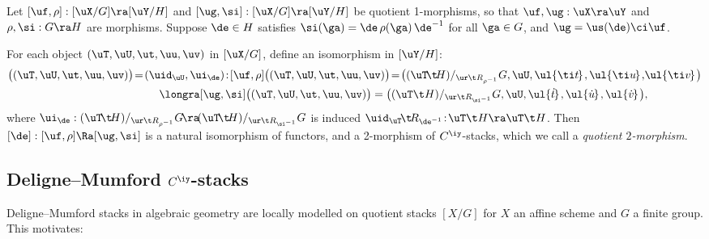 \documentclass{article}
\begin{document}
\begin{ex} Let $[\uf,\rho]:[\uX/G]\ra[\uY/H]$ and
$[\ug,\si]:[\uX/G]\ra[\uY/H]$ be quotient 1-morphisms, so that
$\uf,\ug:\uX\ra\uY$ and $\rho,\si:G\ra H$ are morphisms. Suppose
$\de\in H$ satisfies $\si(\ga)=\de\,\rho(\ga)\,\de^{-1}$ for all
$\ga\in G$, and $\ug=\us(\de)\ci\uf$.

For each object $(\uT,\uU,\ut,\uu,\uv)$ in $[\uX/G]$, define an
isomorphism in $[\uY/H]$:
\begin{align*}
[\de]\bigl((\uT,\uU,\ut,\uu,\uv)\bigr)\!=\!(\uid_\uU,\ui_\de)\!:\!
[\uf,\rho]\bigl((\uT,\uU,\ut,\uu,\uv)\bigr)\!=\!
\bigl((\uT\!\t\! H)/_{\ur\t R_{\rho^{-1}}} G,\uU,
\ul{\ti t\kern -0.1em}\kern 0.1em,
\ul{\ti u\kern -0.1em}\kern 0.1em,&
\ul{\ti v\kern -0.1em}\kern 0.1em\bigr)\\
\longra [\ug,\si]\bigl((\uT,\uU,\ut,\uu,\uv)\bigr)= \bigl((\uT\t
H)/_{\ur\t R_{\si^{-1}}} G,\uU, \ul{\dot t\kern -0.1em}\kern 0.1em,
\ul{\dot u\kern -0.1em}\kern 0.1em, \ul{\dot v\kern -0.1em}\kern
0.1em\bigr)&,
\end{align*}
where $\ui_\de:(\uT\!\t\! H)/_{\ur\t R_{\rho^{-1}}}G\!\ra\!(\uT\!\t
\! H)/_{\ur\t R_{\si^{-1}}}G$ is induced $\uid_\uT\!\t\!
R_{\de^{-1}}\!:\! \uT\t H\ra\uT\t H$. Then $[\de]:[\uf,\rho]\Ra
[\ug,\si]$ is a natural isomorphism of functors, and a 2-morphism of
$C^\iy$-stacks, which we call a {\it quotient\/
$2$-morphism}.
\label{ds8ex3}
\end{ex}

\subsection{Deligne--Mumford $C^\iy$-stacks}
\label{ds85}

Deligne--Mumford stacks in algebraic geometry are locally modelled
on quotient stacks $[X/G]$ for $X$ an affine scheme and $G$ a finite
group. This motivates:
\end{document}
